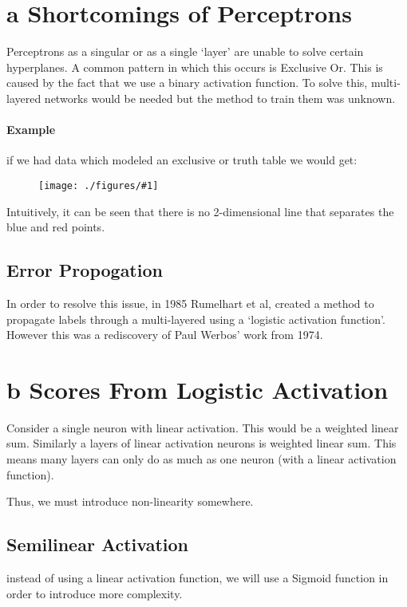 \documentclass[12pt]{book}
\title{\coursetitle\linebreak\lecturename}
\author{\\Cain Susko\\ 
           \\ \\ \\
      Queen's University 
    \\School of Computing\\}
\newcommand{\incimg}[2]{%
       \begin{figure}[h]
               \centering
               \texttt{[image: ./figures/\#1]}
       \end{figure}
}
\begin{document}
\begin{titlepage}
        \maketitle
\end{titlepage}


\section*{a Shortcomings of Perceptrons}
Perceptrons as a singular or as a single `layer' 
are unable to solve certain hyperplanes. A common 
pattern in which this occurs is Exclusive Or.
This is caused by the fact that we use a binary activation function.
To solve this, multi-layered networks would be needed but the method
to train them was unknown.

\paragraph{Example}
if we had data which modeled an exclusive or truth table we would get:
\incimg{Xor}{0.5}

Intuitively, it can be seen that there is no 2-dimensional line that
separates the blue and red points.

\subsection*{Error Propogation}
In order to resolve this issue, in 1985 Rumelhart et al,
created a method to 
propagate labels through a multi-layered using a `logistic activation
function'. However this was a rediscovery of Paul Werbos' work from 
1974.

\section*{b Scores From Logistic Activation}
Consider a single neuron with linear activation. This would be a
weighted linear sum. Similarly a layers of linear activation neurons 
is weighted linear sum. This means many layers can only do as much as
one neuron (with a linear activation function).

Thus, we must introduce non-linearity somewhere.

\subsection*{Semilinear Activation}
instead of using a linear activation function, we will use a 
Sigmoid function in order to introduce more complexity. 
\end{document}
